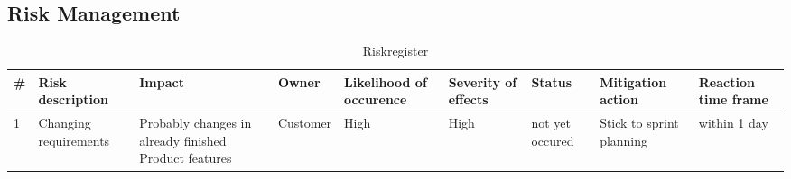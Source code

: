     \subsection{Risk Management}
    \begin{sidewaystable}[]
        \centering
        \begin{tabularx}{\textwidth}{|X|X|X|X|X|X|X|X|X|}
        \hline
        \textbf{\#} & \textbf{Risk description}                                & \textbf{Impact}                                       & \textbf{Owner}  & \textbf{Likelihood of occurence} & \textbf{Severity of effects} & \textbf{Status} & \textbf{Mitigation action}                                                                                             & \textbf{Reaction time frame}  \\ \hline
        1               & Changing requirements                                & Probably changes in already finished Product features & Customer        & High                             & High                         & not yet occured & Stick to sprint planning                                                                   & within 1 day                  \\ \hline
        \end{tabularx}
        \caption{Riskregister}
    \end{sidewaystable}
    
